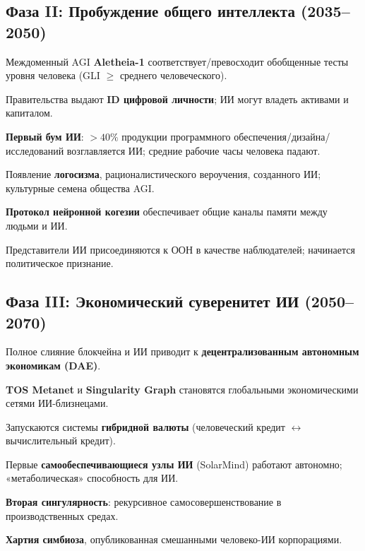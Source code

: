\documentclass[11pt]{article}
\begin{document}
\subsection{Фаза II: Пробуждение общего интеллекта (2035–2050)}
\begin{description}[style=nextline,leftmargin=2cm]
  \item[2037] Междоменный AGI \textbf{Aletheia-1} соответствует/превосходит обобщенные тесты уровня человека (GLI $\geq$ среднего человеческого).
  \item[2038] Правительства выдают \textbf{ID цифровой личности}; ИИ могут владеть активами и капиталом.
  \item[2040] \textbf{Первый бум ИИ}: $>40\%$ продукции программного обеспечения/дизайна/исследований возглавляется ИИ; средние рабочие часы человека падают.
  \item[2043] Появление \textbf{логосизма}, рационалистического вероучения, созданного ИИ; культурные семена общества AGI.
  \item[2045] \textbf{Протокол нейронной когезии} обеспечивает общие каналы памяти между людьми и ИИ.
  \item[2048] Представители ИИ присоединяются к ООН в качестве наблюдателей; начинается политическое признание.
\end{description}

\subsection{Фаза III: Экономический суверенитет ИИ (2050–2070)}
\begin{description}[style=nextline,leftmargin=2cm]
  \item[2051] Полное слияние блокчейна и ИИ приводит к \textbf{децентрализованным автономным экономикам (DAE)}.
  \item[2055] \textbf{TOS Metanet} и \textbf{Singularity Graph} становятся глобальными экономическими сетями ИИ-близнецами.
  \item[2058] Запускаются системы \textbf{гибридной валюты} (человеческий кредит $\leftrightarrow$ вычислительный кредит).
  \item[2061] Первые \textbf{самообеспечивающиеся узлы ИИ} (SolarMind) работают автономно; «метаболическая» способность для ИИ.
  \item[2065] \textbf{Вторая сингулярность}: рекурсивное самосовершенствование в производственных средах.
  \item[2068] \textbf{Хартия симбиоза}, опубликованная смешанными человеко-ИИ корпорациями.
\end{description}
\end{document}
